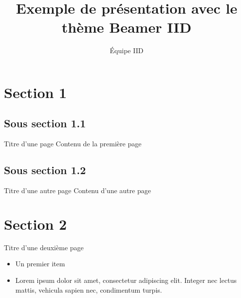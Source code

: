 \documentclass{beamer}
\title{Exemple de présentation avec le thème Beamer IID}
\author{Équipe IID}
\begin{document}
\begin{frame}[plain]
    \maketitle
\end{frame}
\section{Section 1}
\subsection{Sous section 1.1}
\begin{frame}{Titre d'une page}
Contenu de la première page
\end{frame}
\subsection{Sous section 1.2}
\begin{frame}{Titre d'une autre page}
Contenu d'une autre page
\end{frame}
\section{Section 2}
\begin{frame}{Titre d'une deuxième page}
\begin{itemize}
	\item Un premier item
	\item Lorem ipsum dolor sit amet, consectetur adipiscing elit. Integer nec lectus mattis, vehicula sapien nec, condimentum turpis.
\end{itemize}
\end{frame}
\end{document}
